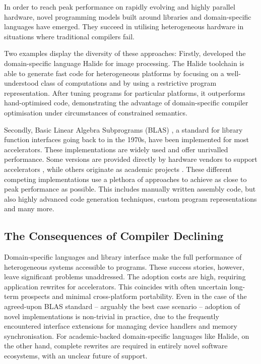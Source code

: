     In order to reach peak performance on rapidly evolving and highly parallel
    hardware, novel programming models built around libraries and
    domain-specific languages have emerged.
    They succeed in utilising heterogeneous hardware in situations where
    traditional compilers fail.

    Two examples display the diversity of these approaches:
    Firstly, \citet{Ragan-Kelley2013Halide} developed the domain-specific
    language Halide for image processing.
    The Halide toolchain is able to generate fast code for heterogeneous
    platforms by focusing on a well-understood class of computations and by
    using a restrictive program representation.
    After tuning programs for particular platforms, it outperforms
    hand-optimised code, demonstrating the advantage of domain-specific compiler
    optimisation under circumstances of constrained semantics.

    Secondly, Basic Linear Algebra Subprograms (BLAS)
    \citep{2002:USB:567806.567807}, a standard for library function interfaces
    going back to \citet{Lawson:1979:BLA:355841.355847} in the 1970s, have been
    implemented for most accelerators.
    These implementations are widely used and offer unrivalled performance.
    Some versions are provided directly by hardware vendors to support
    accelerators \citep{mkl,cublas,clblas,apl,qml}, while others originate as
    academic projects \citep{Wang:2013:AAG:2503210.2503219}.
    These different competing implementations use a plethora of approaches to achieve as
    close to peak performance as possible.
    This includes manually written assembly code, but also highly advanced
    code generation techniques, custom program representations and many more.

\subsection{The Consequences of Compiler Declining}

    Domain-specific languages and library interface make the full performance of
    heterogeneous systems accessible to programs.
    These success stories, however, leave significant problems unaddressed.
    The adoption costs are high, requiring application rewrites for
    accelerators.
    This coincides with often uncertain long-term prospects and minimal
    cross-platform portability.
    Even in the case of the agreed-upon BLAS standard -- arguably the best case
    scenario -- adoption of novel implementations is non-trivial in practice,
    due to the frequently encountered interface extensions for managing device
    handlers and memory synchronisation.
    For academic-backed domain-specific languages like Halide, on the other
    hand, complete rewrites are required in entirely novel software ecosystems,
    with an unclear future of support.


